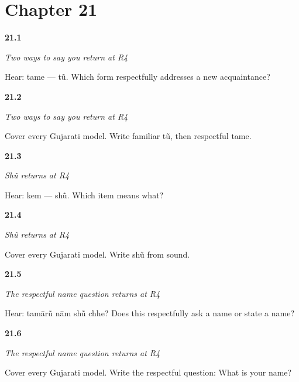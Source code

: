 \section*{Chapter 21}

\noindent\begin{minipage}[t]{\linewidth}
\raggedright
\hypertarget{review-GU-R17-you-r4-listening}{\textbf{21.1}} \emph{Two ways to say you return at R4}\par
\small Hear: tame — tũ. Which form respectfully addresses a new acquaintance?
\end{minipage}\par\medskip

\noindent\begin{minipage}[t]{\linewidth}
\raggedright
\hypertarget{review-GU-R17-you-r4-writing}{\textbf{21.2}} \emph{Two ways to say you return at R4}\par
\small Cover every Gujarati model. Write familiar tũ, then respectful tame.
\end{minipage}\par\medskip

\noindent\begin{minipage}[t]{\linewidth}
\raggedright
\hypertarget{review-GU-R17-shun-r4-listening}{\textbf{21.3}} \emph{Shũ returns at R4}\par
\small Hear: kem — shũ. Which item means what?
\end{minipage}\par\medskip

\noindent\begin{minipage}[t]{\linewidth}
\raggedright
\hypertarget{review-GU-R17-shun-r4-writing}{\textbf{21.4}} \emph{Shũ returns at R4}\par
\small Cover every Gujarati model. Write shũ from sound.
\end{minipage}\par\medskip

\noindent\begin{minipage}[t]{\linewidth}
\raggedright
\hypertarget{review-GU-R17-whats-your-name-r4-listening}{\textbf{21.5}} \emph{The respectful name question returns at R4}\par
\small Hear: tamārũ nām shũ chhe? Does this respectfully ask a name or state a name?
\end{minipage}\par\medskip

\noindent\begin{minipage}[t]{\linewidth}
\raggedright
\hypertarget{review-GU-R17-whats-your-name-r4-writing}{\textbf{21.6}} \emph{The respectful name question returns at R4}\par
\small Cover every Gujarati model. Write the respectful question: What is your name?
\end{minipage}\par\medskip


